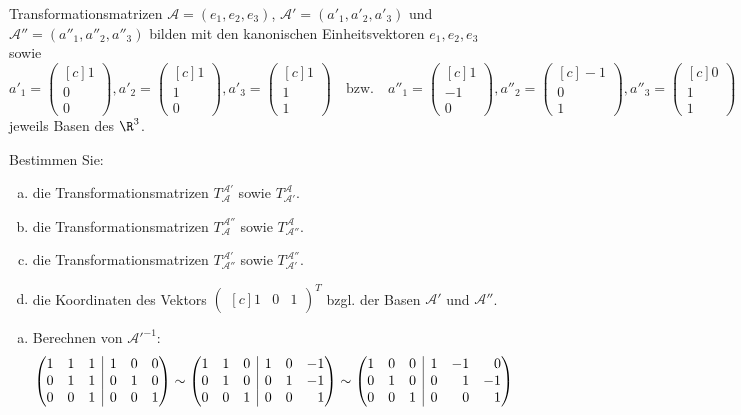 \documentclass[german]{../spicker}
\makeatletter
\newcommand{\vektor}[1]{\begin{pmatrix*}[c] #1 \end{pmatrix*}}
\newenvironment{sysmatrix}[1]
 {\left(\begin{array}{@{}#1@{}}}
 {\end{array}\right)}
\makeatother
\begin{document}
\begin{example}{Transformationsmatrizen}
    $\mathcal{A}  = (e_1, e_2, e_3)$, $\mathcal{A}' = (a'_1, a'_2, a'_3)$ und $\mathcal{A}'' = (a''_1, a''_2, a''_3)$ bilden mit den kanonischen Einheitsvektoren $e_1, e_2, e_3$ sowie
    $$
        a'_1 = \vektor{1\\0\\0}, a'_2 = \vektor{1\\1\\0}, a'_3 = \vektor{1\\1\\1}
        \quad \text{bzw.} \quad
        a''_1 = \vektor{1\\-1\\0}, a''_2 = \vektor{-1\\0\\1}, a''_3 = \vektor{0\\1\\1}
    $$
    jeweils Basen des $\R^3$.

    Bestimmen Sie:
    \begin{enumerate}[a)]
        \item die Transformationsmatrizen $T^{\mathcal{A}'}_{\mathcal{A}}$ sowie $T^{\mathcal{A}}_{\mathcal{A}'}$.
        \item die Transformationsmatrizen $T^{\mathcal{A}''}_{\mathcal{A}}$ sowie $T^{\mathcal{A}}_{\mathcal{A}''}$.
        \item die Transformationsmatrizen $T^{\mathcal{A}'}_{\mathcal{A}''}$ sowie $T^{\mathcal{A}''}_{\mathcal{A}'}$.
        \item die Koordinaten des Vektors $\vektor{1 & 0 & 1}^T$ bzgl. der Basen $\mathcal{A}'$ und $\mathcal{A}''$.
    \end{enumerate}

    \exampleseparator

    \begin{enumerate}[a)]
        \item Berechnen von $\mathcal{A}'^{-1}$:
              $$
                  \begin{sysmatrix}{rrr|rrr}
                      1 & 1 & 1 & 1 & 0 & 0 \\
                      0 & 1 & 1 & 0 & 1 & 0 \\
                      0 & 0 & 1 & 0 & 0 & 1
                  \end{sysmatrix}
                  \sim
                  \begin{sysmatrix}{rrr|rrr}
                      1 & 1 & 0 & 1 & 0 & -1 \\
                      0 & 1 & 0 & 0 & 1 & -1 \\
                      0 & 0 & 1 & 0 & 0 & 1
                  \end{sysmatrix}
                  \sim
                  \begin{sysmatrix}{rrr|rrr}
                      1 & 0 & 0 & 1 & -1 & 0 \\
                      0 & 1 & 0 & 0 & 1 & -1 \\
                      0 & 0 & 1 & 0 & 0 & 1
                  \end{sysmatrix}
              $$


\end{enumerate}
\end{example}
\end{document}
